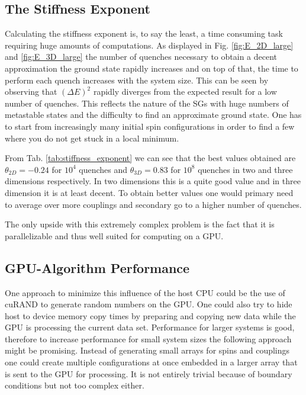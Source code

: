 \documentclass[paper=a4, fontsize=11pt]{scrartcl} %
\numberwithin{equation}{section} %
\numberwithin{figure}{section} %
\numberwithin{table}{section} %
\begin{document}
\subsection{The Stiffness Exponent}
Calculating the stiffness exponent is, to say the least, a time consuming task requiring huge amounts of computations. As displayed in Fig. \ref{fig:E_2D_large} and \ref{fig:E_3D_large} the number of quenches necessary to obtain a decent approximation the ground state rapidly increases and on top of that, the time to perform each quench increases with the system size. This can be seen by observing that $(\Delta E)^2$ rapidly diverges from the expected result for a low number of quenches. This reflects the nature of the SGs with huge numbers of metastable states and the difficulty to find an approximate ground state. One has to start from increasingly many initial spin configurations in order to find a few where you do not get stuck in a local minimum. 

From Tab. \ref{tab:stiffness_exponent} we can see that the best values obtained are $\theta_{2D}=-0.24$ for $10^4$ quenches and $\theta_{3D}=0.83$ for $10^8$ quenches in two and three dimensions respectively. In two dimensions this is a quite good value and in three dimension it is at least decent. To obtain better values one would primary need to average over more couplings and secondary go to a higher number of quenches.

The only upside with this extremely complex problem is the fact that it is parallelizable and thus well suited for computing on a GPU.

\subsection{GPU-Algorithm Performance}
\label{sec:discussion_gpualgo}

One  approach to minimize this influence of the host CPU could be the use of cuRAND to generate random numbers on the GPU. One could also try to hide host to device memory copy times by preparing and copying new data while the GPU is processing the current data set. Performance for larger systems is good, therefore to increase performance for small system sizes the following approach might be promising. Instead of generating small arrays for spins and couplings one could create multiple configurations at once embedded in a larger array that is sent to the GPU for processing. It is not entirely trivial because of boundary conditions but not too complex either.
\end{document}
